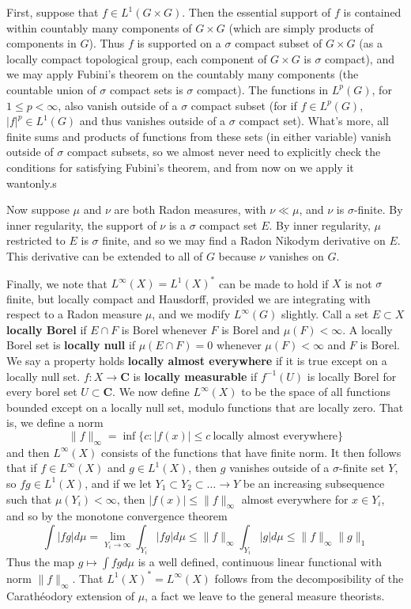 First, suppose that $f \in L^1(G \times G)$. Then the essential support of $f$ is contained within countably many components of $G \times G$ (which are simply products of components in $G$). Thus $f$ is supported on a $\sigma$ compact subset of $G \times G$ (as a locally compact topological group, each component of $G \times G$ is $\sigma$ compact), and we may apply Fubini's theorem on the countably many components (the countable union of $\sigma$ compact sets is $\sigma$ compact). The functions in $L^p(G)$, for $1 \leq p < \infty$, also vanish outside of a $\sigma$ compact subset (for if $f \in L^p(G)$, $|f|^p \in L^1(G)$ and thus vanishes outside of a $\sigma$ compact set). What's more, all finite sums and products of functions from these sets (in either variable) vanish outside of $\sigma$ compact subsets, so we almost never need to explicitly check the conditions for satisfying Fubini's theorem, and from now on we apply it wantonly.s

Now suppose $\mu$ and $\nu$ are both Radon measures, with $\nu \ll \mu$, and $\nu$ is $\sigma$-finite. By inner regularity, the support of $\nu$ is a $\sigma$ compact set $E$. By inner regularity, $\mu$ restricted to $E$ is $\sigma$ finite, and so we may find a Radon Nikodym derivative on $E$. This derivative can be extended to all of $G$ because $\nu$ vanishes on $G$. 

Finally, we note that $L^\infty(X) = L^1(X)^*$ can be made to hold if $X$ is not $\sigma$ finite, but locally compact and Hausdorff, provided we are integrating with respect to a Radon measure $\mu$, and we modify $L^\infty(G)$ slightly. Call a set $E \subset X$ {\bf locally Borel} if $E \cap F$ is Borel whenever $F$ is Borel and $\mu(F) < \infty$. A locally Borel set is {\bf locally null} if $\mu(E \cap F) = 0$ whenever $\mu(F) < \infty$ and $F$ is Borel. We say a property holds {\bf locally almost everywhere} if it is true except on a locally null set. $f: X \to \mathbf{C}$ is {\bf locally measurable} if $f^{-1}(U)$ is locally Borel for every borel set $U \subset \mathbf{C}$. We now define $L^\infty(X)$ to be the space of all functions bounded except on a locally null set, modulo functions that are locally zero. That is, we define a norm
%
\[ \| f \|_\infty = \inf \{ c : |f(x)| \leq c\ \text{locally almost everywhere} \} \]
%
and then $L^\infty(X)$ consists of the functions that have finite norm. It then follows that if $f \in L^\infty(X)$ and $g \in L^1(X)$, then $g$ vanishes outside of a $\sigma$-finite set $Y$, so $fg \in L^1(X)$, and if we let $Y_1 \subset Y_2 \subset \dots \to Y$ be an increasing subsequence such that $\mu(Y_i) < \infty$, then $|f(x)| \leq \| f \|_\infty$ almost everywhere for $x \in Y_i$, and so by the monotone convergence theorem
%
\[ \int |fg| d\mu = \lim_{Y_i \to \infty} \int_{Y_i} |fg| d\mu \leq \| f \|_\infty \int_{Y_i} |g| d\mu \leq \| f \|_\infty \| g \|_1 \]
%
Thus the map $g \mapsto \int fg d\mu$ is a well defined, continuous linear functional with norm $\| f \|_\infty$. That $L^1(X)^* = L^\infty(X)$ follows from the decomposibility of the Carath\'{e}odory extension of $\mu$, a fact we leave to the general measure theorists.

